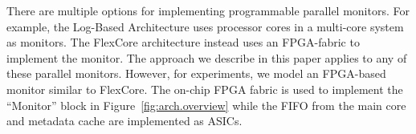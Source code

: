 There are multiple options for implementing programmable parallel monitors. For example, the
Log-Based Architecture \cite{chen08-lba} uses processor cores in a multi-core
system as monitors. The FlexCore architecture \cite{deng-flexcore-micro10}
instead uses an FPGA-fabric to implement the monitor. The approach we describe
in this paper applies to any of these parallel monitors. However, for experiments,
we model an FPGA-based monitor similar to FlexCore. 
The on-chip FPGA fabric is
used to implement the ``Monitor'' block in Figure~\ref{fig:arch.overview}
while the FIFO from the main core and metadata cache are implemented as ASICs.
